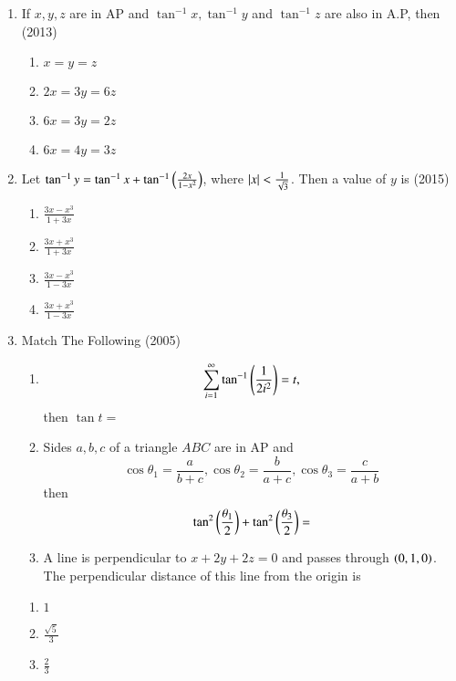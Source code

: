\begin{enumerate}[label=\thesubsection.\arabic*,ref=\thesubsection.\theenumi]
{\begin{multicols}{4}
		\end{multicols}
	}
	\item{
			If $x,y,z$ are in AP and $\tan^{-1}x, \tan^{-1}y$  and $\tan^{-1}z$ are also in A.P, then \hfill (2013)
		\begin{multicols}{4}
		\begin{enumerate}
			\item{$x=y=z$}
			\item{$2x=3y=6z$}
			\item{$6x=3y=2z$}
			\item{$6x=4y=3z$}
		\end{enumerate}
		\end{multicols}
	}
	\item{
			Let $\tan^{-1}y = \tan^{-1}x + \tan^{-1}\left(\frac{2x}{1-x^2}\right)$, where $\left\vert x\right\vert < \frac{1}{\sqrt{3}}$. Then a value of $y$ is \hfill (2015)
		\begin{multicols}{4}
		\begin{enumerate}
			\item{$\frac{3x - x^3}{1 + 3x}$}
%			
			\item{$\frac{3x + x^3}{1 + 3x}$}
%			
			\item{$\frac{3x - x^3}{1 - 3x}$}
%			
			\item{$\frac{3x + x^3}{1 - 3x}$}
		\end{enumerate}
		\end{multicols}
	}
	\item{
		Match The Following \hfill (2005)
		\begin{multicols}{2}
			\begin{enumerate}
				\item{\footnotesize $$\sum_{i=1}^{\infty}\tan^{-1}\left(\frac{1}{2i^2}\right)=t,$$ then $\tan t =$}
				\item{\footnotesize Sides $a,b,c$ of a triangle $ABC$ are in AP and $$\cos\theta_1=\frac{a}{b+c}, \cos\theta_2=\frac{b}{a+c}, \cos\theta_3=\frac{c}{a+b}$$ then $$\tan^2\left(\frac{\theta_1}{2}\right)+\tan^2\left(\frac{\theta_3}{2}\right) = $$}
				\item{\footnotesize A line is perpendicular to $x+2y+2z=0$ and passes through $\left(0,1,0\right)$. The perpendicular distance of this line from the origin is}
			\end{enumerate}
			\columnbreak
			\begin{enumerate}
				\item{$1$}
				\item{$\frac{\sqrt{5}}{3}$}
				\item{$\frac{2}{3}$}

\end{enumerate}
\end{multicols}}
\end{enumerate}
